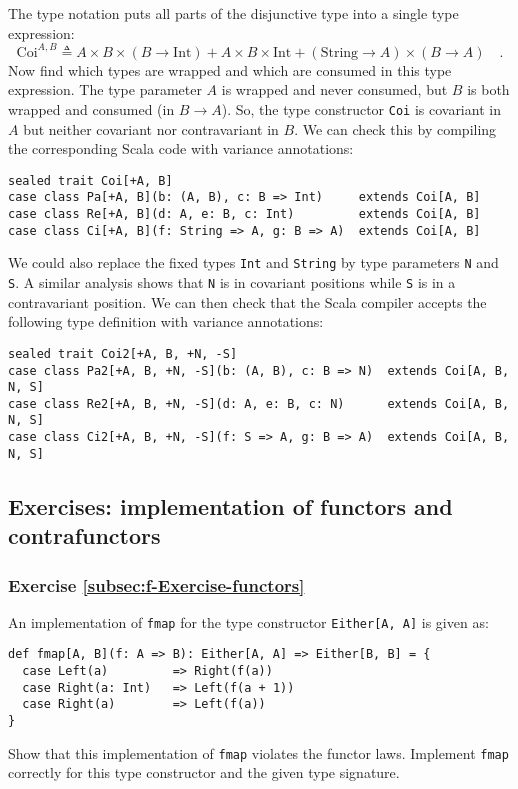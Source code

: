 The type notation puts all parts of the disjunctive type into a single
type expression:
\[
\text{Coi}^{A,B}\triangleq A\times B\times(B\rightarrow\text{Int})+A\times B\times\text{Int}+(\text{String}\rightarrow A)\times(B\rightarrow A)\quad.
\]
Now find which types are wrapped and which are consumed in this type
expression. The type parameter $A$ is wrapped and never consumed,
but $B$ is both wrapped and consumed (in $B\rightarrow A$). So,
the type constructor \lstinline!Coi! is covariant in $A$ but neither
covariant nor contravariant in $B$. We can check this by compiling
the corresponding Scala code with variance annotations:
\begin{lstlisting}
sealed trait Coi[+A, B]
case class Pa[+A, B](b: (A, B), c: B => Int)     extends Coi[A, B]
case class Re[+A, B](d: A, e: B, c: Int)         extends Coi[A, B]
case class Ci[+A, B](f: String => A, g: B => A)  extends Coi[A, B]
\end{lstlisting}
We could also replace the fixed types \lstinline!Int! and \lstinline!String!
by type parameters \lstinline!N! and \lstinline!S!. A similar analysis
shows that \lstinline!N! is in covariant positions while \lstinline!S!
is in a contravariant position. We can then check that the Scala compiler
accepts the following type definition with variance annotations:
\begin{lstlisting}
sealed trait Coi2[+A, B, +N, -S]
case class Pa2[+A, B, +N, -S](b: (A, B), c: B => N)  extends Coi[A, B, N, S]
case class Re2[+A, B, +N, -S](d: A, e: B, c: N)      extends Coi[A, B, N, S]
case class Ci2[+A, B, +N, -S](f: S => A, g: B => A)  extends Coi[A, B, N, S]
\end{lstlisting}


\subsection{Exercises: implementation of functors and contrafunctors}

\subsubsection{Exercise \label{subsec:f-Exercise-functors}\ref{subsec:f-Exercise-functors}}

An implementation of \lstinline!fmap! for the type constructor \lstinline!Either[A, A]!
is given as:
\begin{lstlisting}
def fmap[A, B](f: A => B): Either[A, A] => Either[B, B] = {
  case Left(a)         => Right(f(a))
  case Right(a: Int)   => Left(f(a + 1))
  case Right(a)        => Left(f(a))
}
\end{lstlisting}
Show that this implementation of \lstinline!fmap! violates the functor
laws. Implement \lstinline!fmap! correctly for this type constructor
and the given type signature.

